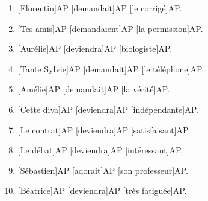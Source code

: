 \documentclass[output=paper,colorlinks,citecolor=brown,draftmode]{langscibook}
\begin{document}
\label{app:11:b}
\begin{enumerate}
\item  {[Florentin]AP [demandait]AP [le corrigé]AP.}

\item	{[Tes amis]AP [demandaient]AP [la permission]AP.}

\item	{[Aurélie]AP [deviendra]AP [biologiste]AP.}

\item	{[Tante Sylvie]AP [demandait]AP [le téléphone]AP.}

\item	{[Amélie]AP [demandait]AP [la vérité]AP.}

\item	{[Cette diva]AP [deviendra]AP [indépendante]AP.}

\item	{[Le contrat]AP [deviendra]AP [satisfaisant]AP.}

\item	{[Le débat]AP [deviendra]AP [intéressant]AP.}

\item	{[Sébastien]AP [adorait]AP [son professeur]AP.}

\item	{[Béatrice]AP [deviendra]AP [très fatiguée]AP.}
\end{enumerate}

\printbibliography[heading=subbibliography,notkeyword=this]
\end{document}
